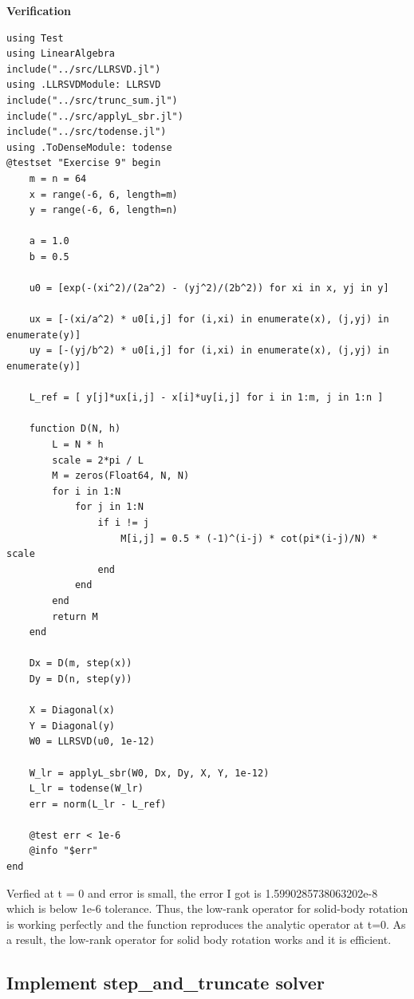 \documentclass[11pt]{report}
\begin{document}
\textbf{Verification}
\begin{lstlisting}
using Test
using LinearAlgebra
include("../src/LLRSVD.jl")
using .LLRSVDModule: LLRSVD
include("../src/trunc_sum.jl")
include("../src/applyL_sbr.jl")
include("../src/todense.jl")
using .ToDenseModule: todense
@testset "Exercise 9" begin
    m = n = 64
    x = range(-6, 6, length=m)
    y = range(-6, 6, length=n)

    a = 1.0
    b = 0.5

    u0 = [exp(-(xi^2)/(2a^2) - (yj^2)/(2b^2)) for xi in x, yj in y]

    ux = [-(xi/a^2) * u0[i,j] for (i,xi) in enumerate(x), (j,yj) in enumerate(y)]
    uy = [-(yj/b^2) * u0[i,j] for (i,xi) in enumerate(x), (j,yj) in enumerate(y)]

    L_ref = [ y[j]*ux[i,j] - x[i]*uy[i,j] for i in 1:m, j in 1:n ]

    function D(N, h)
        L = N * h
        scale = 2*pi / L
        M = zeros(Float64, N, N)
        for i in 1:N
            for j in 1:N
                if i != j
                    M[i,j] = 0.5 * (-1)^(i-j) * cot(pi*(i-j)/N) * scale
                end
            end
        end
        return M
    end

    Dx = D(m, step(x))
    Dy = D(n, step(y))

    X = Diagonal(x)
    Y = Diagonal(y)
    W0 = LLRSVD(u0, 1e-12)

    W_lr = applyL_sbr(W0, Dx, Dy, X, Y, 1e-12)
    L_lr = todense(W_lr)
    err = norm(L_lr - L_ref)

    @test err < 1e-6
    @info "$err"
end
\end{lstlisting}
Verfied at t = 0 and error is small, the error I got is 1.5990285738063202e-8 which is below 1e-6 tolerance. Thus, the low-rank operator for solid-body rotation is working perfectly and the function reproduces the analytic operator at t=0. As a result, the low-rank operator for solid body rotation works and it is efficient.

\subsection{Implement step\_and\_truncate solver}
\end{document}
